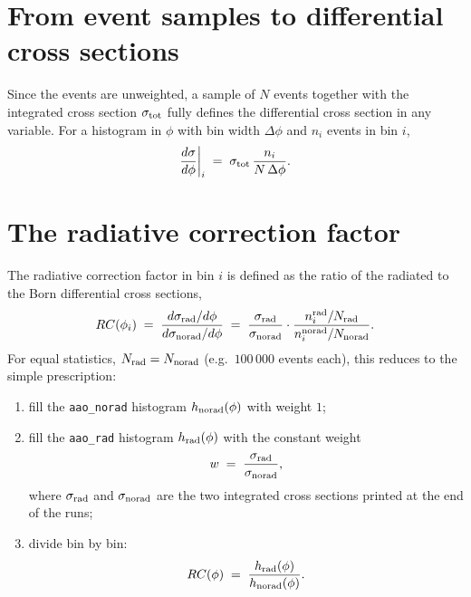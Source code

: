 \documentclass[11pt]{article}
\begin{document}
\section{From event samples to differential cross sections}

Since the events are unweighted, a sample of $N$ events together with the
integrated cross section $\sigma_{\rm tot}$ fully defines the differential
cross section in any variable. For a histogram in $\phi$ with bin width
$\Delta\phi$ and $n_i$ events in bin $i$,
\begin{equation}
  \frac{d\sigma}{d\phi}\bigg|_i \;=\;
  \sigma_{\rm tot}\,\frac{n_i}{N\,\Delta\phi}.
  \label{eq:dsig}
\end{equation}

\section{The radiative correction factor}

The radiative correction factor in bin $i$ is defined as the ratio of the
radiated to the Born differential cross sections,
\begin{equation}
  RC(\phi_i) \;=\;
  \frac{d\sigma_{\rm rad}/d\phi}{d\sigma_{\rm norad}/d\phi}
  \;=\;
  \frac{\sigma_{\rm rad}}{\sigma_{\rm norad}}\cdot
  \frac{n_i^{\rm rad}/N_{\rm rad}}{n_i^{\rm norad}/N_{\rm norad}}.
  \label{eq:rc}
\end{equation}
For equal statistics, $N_{\rm rad}=N_{\rm norad}$ (e.g.\ $100\,000$ events
each), this reduces to the simple prescription:
\begin{enumerate}
  \item fill the \texttt{aao\_norad} histogram $h_{\rm norad}(\phi)$ with
        weight $1$;
  \item fill the \texttt{aao\_rad} histogram $h_{\rm rad}(\phi)$ with the
        constant weight
        \begin{equation}
          w \;=\; \frac{\sigma_{\rm rad}}{\sigma_{\rm norad}},
        \end{equation}
        where $\sigma_{\rm rad}$ and $\sigma_{\rm norad}$ are the two
        integrated cross sections printed at the end of the runs;
  \item divide bin by bin:
        \begin{equation}
          RC(\phi) \;=\; \frac{h_{\rm rad}(\phi)}{h_{\rm norad}(\phi)}.
        \end{equation}
\end{enumerate}
\end{document}
